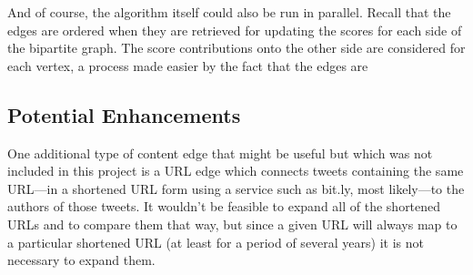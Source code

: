 And of course, the algorithm itself could also be run in parallel. Recall that the edges are ordered when they are retrieved for updating the scores for each side of the bipartite graph. The score contributions onto the other side are considered for each vertex, a process made easier by the fact that the edges are 


\subsection{Potential Enhancements}

One additional type of content edge that might be useful but which was not included in this project is a URL edge which connects tweets containing the same URL---in a shortened URL form using a service such as bit.ly, most likely---to the authors of those tweets. It wouldn't be feasible to expand all of the shortened URLs and to compare them that way, but since a given URL will always map to a particular shortened URL (at least for a period of several years) it is not necessary to expand them.

